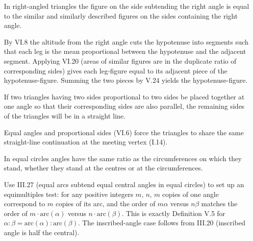 \begin{claim}
\label{prop:VI.31}
In right-angled triangles the figure on the side subtending the right
angle is equal to the similar and similarly described figures on the
sides containing the right angle.
\end{claim}
\begin{evidence}[Proof of VI.31]
\label{ev:VI.31}
By VI.8 the altitude from the right angle cuts the hypotenuse into
segments such that each leg is the mean proportional between the
hypotenuse and the adjacent segment.  Applying VI.20 (areas of
similar figures are in the duplicate ratio of corresponding sides)
gives each leg-figure equal to its adjacent piece of the
hypotenuse-figure.  Summing the two pieces by V.24 yields the
hypotenuse-figure.
\end{evidence}

\begin{claim}
\label{prop:VI.32}
If two triangles having two sides proportional to two sides be placed
together at one angle so that their corresponding sides are also
parallel, the remaining sides of the triangles will be in a straight
line.
\end{claim}
\begin{evidence}[Proof of VI.32]
\label{ev:VI.32}
Equal angles and proportional sides (VI.6) force the triangles to
share the same straight-line continuation at the meeting vertex (I.14).
\end{evidence}

\begin{claim}
\label{prop:VI.33}
In equal circles angles have the same ratio as the circumferences on
which they stand, whether they stand at the centres or at the
circumferences.
\end{claim}
\begin{evidence}[Proof of VI.33]
\label{ev:VI.33}
Use III.27 (equal arcs subtend equal central angles in equal circles)
to set up an equimultiples test: for any positive integers $m$, $n$,
$m$ copies of one angle correspond to $m$ copies of its arc, and the
order of $m \alpha$ versus $n \beta$ matches the order of $m \cdot
\mathrm{arc}(\alpha)$ versus $n \cdot \mathrm{arc}(\beta)$.  This is
exactly Definition V.5 for $\alpha : \beta = \mathrm{arc}(\alpha) :
\mathrm{arc}(\beta)$.  The inscribed-angle case follows from III.20
(inscribed angle is half the central).
\end{evidence}
